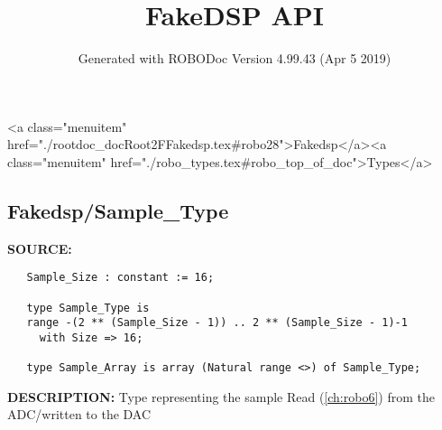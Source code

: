 \documentclass{article}
\title{FakeDSP API}
\author{Generated with ROBODoc Version 4.99.43 (Apr  5 2019)
}
\begin{document}
\maketitle
\printindex
\tableofcontents
\newpage

<a class="menuitem" href="./rootdoc_docRoot2FFakedsp.tex#robo28">Fakedsp</a><a class="menuitem" href="./robo_types.tex#robo_top_of_doc">Types</a>\subsection{Fakedsp/Sample\_Type}
\textbf{SOURCE:}\hspace{0.08in}\begin{verbatim}
   Sample_Size : constant := 16;

   type Sample_Type is
   range -(2 ** (Sample_Size - 1)) .. 2 ** (Sample_Size - 1)-1
     with Size => 16;

   type Sample_Array is array (Natural range <>) of Sample_Type;
\end{verbatim}
\textbf{DESCRIPTION:}\hspace{0.08in}
   Type representing the sample Read (\ref{ch:robo6}) from the ADC/written to the DAC
\end{document}
